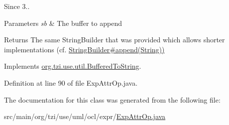 \begin{DoxySince}{Since}
3.. 
\end{DoxySince}

\begin{DoxyParams}{Parameters}
{\em sb} & The buffer to append \\
\hline
\end{DoxyParams}
\begin{DoxyReturn}{Returns}
The same String\-Builder that was provided which allows shorter implementations (cf. \hyperlink{}{String\-Builder\#append(\-String))} 
\end{DoxyReturn}


Implements \hyperlink{interfaceorg_1_1tzi_1_1use_1_1util_1_1_buffered_to_string_aea95e4e53b18818d50ee253700e6e2d5}{org.\-tzi.\-use.\-util.\-Buffered\-To\-String}.



Definition at line 90 of file Exp\-Attr\-Op.\-java.



The documentation for this class was generated from the following file\-:\begin{DoxyCompactItemize}
\item 
src/main/org/tzi/use/uml/ocl/expr/\hyperlink{_exp_attr_op_8java}{Exp\-Attr\-Op.\-java}\end{DoxyCompactItemize}
